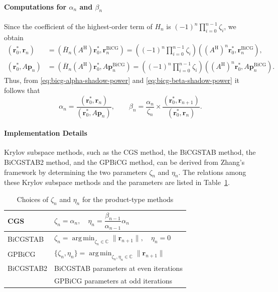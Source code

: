 \paragraph{{Computations for $\alpha_n$ and $\beta_n$}}\label{subsec:product-alpha-beta}\mbox{}\par
{Since the coefficient of the highest-order term of $H_n$ is $(-1)^n\prod_{i=0}^{n-1}\zeta_i$, we obtain}
\[\begin{aligned}(\bm r_0^{*},\bm r_n)&=(\bar H_n(A^{\mathrm H})\bm r_0^{*},\bm r_n^{\mathrm{BiCG}})=\left((-1)^n\prod_{i=0}^{n-1}\zeta_i\right)((A^{\mathrm H})^n\bm r_0^{*},\bm r_n^{\mathrm{BiCG}}),\\(\bm r_0^{*},A\bm p_n)&=(\bar H_n(A^{\mathrm H})\bm r_0^{*},A\bm p_n^{\mathrm{BiCG}})=\left((-1)^n\prod_{i=0}^{n-1}\zeta_i\right)((A^{\mathrm H})^n\bm r_0^{*},A\bm p_n^{\mathrm{BiCG}}).\end{aligned}\]
{Thus, from \eqref{eq:bicg-alpha-shadow-power} and \eqref{eq:bicg-beta-shadow-power} it follows that}
\[\alpha_n=\frac{(\bm r_0^{*},\bm r_n)}{(\bm r_0^{*},A\bm p_n)},\qquad\beta_n=\frac{\alpha_n}{\zeta_n}\times\frac{(\bm r_0^{*},\bm r_{n+1})}{(\bm r_0^{*},\bm r_n)}.\]
\paragraph{{Implementation Details}}\label{subsec:product-implementation}\mbox{}\par
{Krylov subspace methods, such as the CGS method, the BiCGSTAB method, the BiCGSTAB2 method, and the GPBiCG method, can be derived from Zhang's framework by determining the two parameters $\zeta_n$ and $\eta_n$. The relations among these Krylov subspace methods and the parameters are listed in Table\ \ref{tab:product-parameters}.}
\begin{table}[H]\centering
\caption{{Choices of $\zeta_n$ and $\eta_n$ for the product-type methods}}\label{tab:product-parameters}
\begin{tabular}{l|l}\hline
CGS&$\zeta_n=\alpha_n,\quad\eta_n=\dfrac{\beta_{n-1}}{\alpha_{n-1}}\alpha_n$\\\hline
BiCGSTAB&$\zeta_n=\operatorname*{arg\,min}_{\zeta_n\in\mathbb C}\|\bm r_{n+1}\|,\quad\eta_n=0$\\\hline
GPBiCG&$\{\zeta_n,\eta_n\}=\operatorname*{arg\,min}_{\zeta_n,\eta_n\in\mathbb C}\|\bm r_{n+1}\|$\\\hline
BiCGSTAB2&{BiCGSTAB parameters at even iterations}\\
&{GPBiCG parameters at odd iterations}\\\hline
\end{tabular}\end{table}

